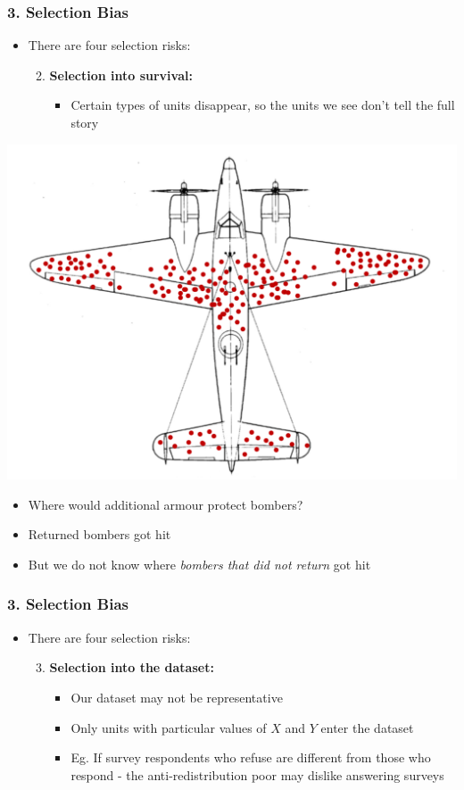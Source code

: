 \documentclass[xcolor=x11names,compress]{beamer}\usepackage[]{graphicx}\usepackage[]{color}
\renewcommand{\(}{\begin{columns}}
\renewcommand{\)}{\end{columns}}
\newcommand{\<}[1]{\begin{column}{#1}}
\renewcommand{\>}{\end{column}}
\begin{document}
\begin{frame}
\frametitle{3. Selection Bias}
\begin{itemize}
\item There are four selection risks:
\begin{enumerate}
\setcounter{enumi}{1}
\item \textbf{Selection into survival:}
\begin{itemize}
\item Certain types of units disappear, so the units we see don't tell the full story
\end{itemize}
\end{enumerate}
\end{itemize}
\begin{multicols}{2}
\includegraphics[scale=0.25]{Bombers.pdf}
\columnbreak
\begin{itemize}
\item Where would additional armour protect bombers?
\item Returned bombers got hit
\item But we do not know where \textit{bombers that did not return} got hit
\end{itemize}
\end{multicols}
\end{frame}

\begin{frame}
\frametitle{3. Selection Bias}
\begin{itemize}
\item There are four selection risks:
\begin{enumerate}
\setcounter{enumi}{2}
\item \textbf{Selection into the dataset:}
\begin{itemize}
\item Our dataset may not be representative
\item Only units with particular values of $X$ and $Y$ enter the dataset
\item Eg. If survey respondents who refuse are different from those who respond - the anti-redistribution poor may dislike answering surveys 
\end{itemize}
\end{enumerate}
\end{itemize}
\end{frame}
\end{document}
